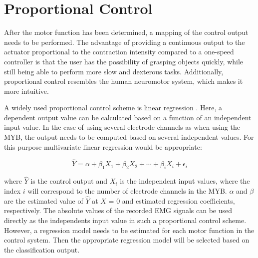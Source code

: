 \section{Proportional Control}
After the motor function has been determined, a mapping of the control output needs to be performed. The advantage of providing a continuous output to the actuator proportional to the contraction intensity compared to a one-speed controller is that the user has the possibility of grasping objects quickly, while still being able to perform more slow and dexterous tasks. Additionally, proportional control resembles the human neuromotor system, which makes it more intuitive. \cite{Fougner2012} 

A widely used proportional control scheme is linear regression \cite{Fougner2012}. Here, a dependent output value can be calculated based on a function of an independent input value. In the case of using several electrode channels as when using the MYB, the output needs to be computed based on several independent values. For this purpose multivariate linear regression would be appropriate:

\begin{equation}
	\hat{Y} = \alpha+\beta_{1}X_{1}+\beta_{2}X_{2}+\cdots+\beta_{i}X_{i}+\epsilon_{i}
\end{equation}

where $\hat{Y}$ is the control output and $X_{i}$ is the independent input values, where the index $i$ will correspond to the number of electrode channels in the MYB. $\alpha$ and $\beta$ are the estimated value of $\hat{Y}$ at $X$ = 0 and estimated regression coefficients, respectively. The absolute values of the recorded EMG signals can be used directly as the independents input value in such a proportional control scheme. \cite{Zar2009} However, a regression model needs to be estimated for each motor function in the control system. Then the appropriate regression model will be selected based on the classification output.  
